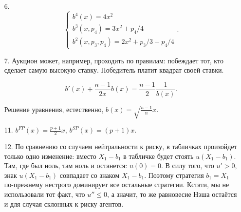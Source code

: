 \begin{enumerate}

\item[6.] \begin{equation}
\begin{cases}
b^{4}(x)=4x^{2} \\
b^{3}(x,p_{4})=3x^{2}+p_{4}/4 \\
b^{2}(x,p_{3},p_{4})=2x^{2}+p_{3}/3-p_{4}/4
\end{cases}.
\end{equation}

\item[7.] Аукцион может, например, проходить по правилам: побеждает тот, кто сделает самую высокую ставку. Победитель платит квадрат своей ставки.

\begin{equation}
b'(x)+\frac{n-1}{2x}b(x)=\frac{n-1}{2}\frac{1}{b(x)}.
\end{equation}

Решение уравнения, естественно, $b(x)=\sqrt{\frac{n-1}{n}x}$.

\item[11.] $b^{FP}(x)=\frac{p+1}{2}x$, $b^{SP}(x)=(p+1)x$.

\item[12.] По сравнению со случаем нейтральности к риску, в табличках произойдет только одно изменение: вместо $ X_{1}-b_{1} $ в табличке будет стоять $ u(X_{1}-b_{1}) $. Там, где был ноль, там ноль и останется: $ u(0)=0 $. В силу того, что $ u'>0 $, знак $ u(X_{1}-b_{1}) $ совпадает со знаком $ X_{1}-b_{1} $. Поэтому стратегия $ b_{1}=X_{1} $ по-прежнему нестрого доминирует все остальные стратегии. Кстати, мы не использовали  тот факт, что $u''\leq 0 $, а значит, то же равновесие Нэша остаётся и для случая склонных к риску агентов.

\end{enumerate}
